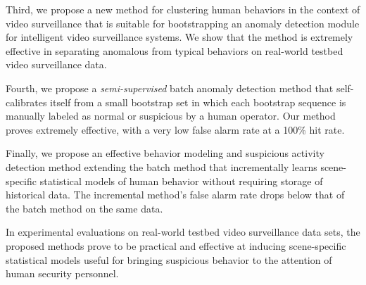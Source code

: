 Third, we propose a new method for clustering human behaviors in the
context of video surveillance that is suitable for bootstrapping an
anomaly detection module for intelligent video surveillance
systems. We show that the method is extremely effective in separating
anomalous from typical behaviors on real-world testbed video
surveillance data.

Fourth, we propose a \textit{semi-supervised} batch anomaly
detection method that self-calibrates itself from a small bootstrap
set in which each bootstrap sequence is manually labeled as normal or
suspicious by a human operator. Our method proves extremely effective,
with a very low false alarm rate at a 100\% hit rate.

Finally, we propose an effective behavior modeling and suspicious
activity detection method extending the batch method that
incrementally learns scene-specific statistical models of human
behavior without requiring storage of historical data. The incremental
method's false alarm rate drops below that of the batch method on the
same data.

In experimental evaluations on real-world testbed video surveillance
data sets, the proposed methods prove to be practical and effective at
inducing scene-specific statistical models useful for bringing
suspicious behavior to the attention of human security personnel.

\setlength{\parskip}{0pt} 
\newpage
{}
\tableofcontents


\newpage
{}
\listoffigures



\newpage
{}
\listoftables



